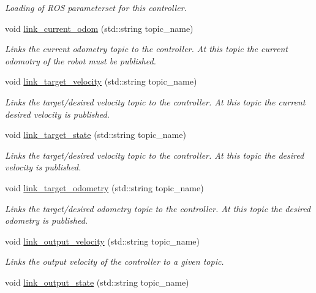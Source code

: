 \begin{DoxyCompactItemize}
\begin{DoxyCompactList}\small\item\em Loading of R\+OS parameterset for this controller. \end{DoxyCompactList}\item 
void \hyperlink{classController_add4a8227097c30e5f165977cfa0ce22c}{link\+\_\+current\+\_\+odom} (std\+::string topic\+\_\+name)
\begin{DoxyCompactList}\small\item\em Links the current odometry topic to the controller. At this topic the current odomotry of the robot must be published. \end{DoxyCompactList}\item 
void \hyperlink{classController_a82a7c805f6e4e0689c675134903e9e58}{link\+\_\+target\+\_\+velocity} (std\+::string topic\+\_\+name)
\begin{DoxyCompactList}\small\item\em Links the target/desired velocity topic to the controller. At this topic the current desired velocity is published. \end{DoxyCompactList}\item 
void \hyperlink{classController_a5f5318b08e7b99d2e5f09c59a6eb61aa}{link\+\_\+target\+\_\+state} (std\+::string topic\+\_\+name)
\begin{DoxyCompactList}\small\item\em Links the target/desired velocity topic to the controller. At this topic the desired velocity is published. \end{DoxyCompactList}\item 
void \hyperlink{classController_a7bf32883aed714275c99d6d182993b73}{link\+\_\+target\+\_\+odometry} (std\+::string topic\+\_\+name)
\begin{DoxyCompactList}\small\item\em Links the target/desired odometry topic to the controller. At this topic the desired odometry is published. \end{DoxyCompactList}\item 
void \hyperlink{classController_afdf03808aee4a1cfcf65a7198ab1a9aa}{link\+\_\+output\+\_\+velocity} (std\+::string topic\+\_\+name)
\begin{DoxyCompactList}\small\item\em Links the output velocity of the controller to a given topic. \end{DoxyCompactList}\item 
void \hyperlink{classController_a9b8949013d52e365754e170a9cad158c}{link\+\_\+output\+\_\+state} (std\+::string topic\+\_\+name)

\end{DoxyCompactItemize}
